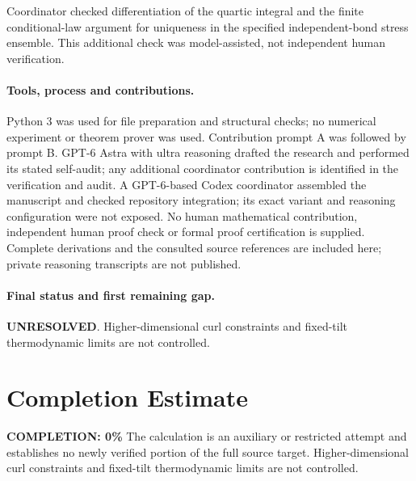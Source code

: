 \documentclass[11pt]{article}
\begin{document}
Coordinator checked differentiation of the quartic integral and the finite conditional-law argument for uniqueness in the specified independent-bond stress ensemble. This additional check was model-assisted, not independent human verification.

\paragraph{Tools, process and contributions.}
Python 3 was used for file preparation and structural checks; no numerical experiment or theorem prover was used. Contribution prompt A was followed by prompt B. GPT-6 Astra with ultra reasoning drafted the research and performed its stated self-audit; any additional coordinator contribution is identified in the verification and audit. A GPT-6-based Codex coordinator assembled the manuscript and checked repository integration; its exact variant and reasoning configuration were not exposed. No human mathematical contribution, independent human proof check or formal proof certification is supplied. Complete derivations and the consulted source references are included here; private reasoning transcripts are not published.

\paragraph{Final status and first remaining gap.}
\textbf{UNRESOLVED}. Higher-dimensional curl constraints and fixed-tilt thermodynamic limits are not controlled.

\section{Completion Estimate}
\noindent\textbf{COMPLETION: 0\%}
The calculation is an auxiliary or restricted attempt and establishes no newly verified portion of the full source target. Higher-dimensional curl constraints and fixed-tilt thermodynamic limits are not controlled.
\end{document}
